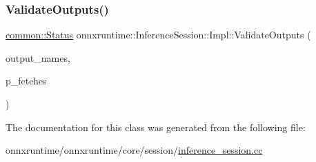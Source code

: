 \subsubsection{\texorpdfstring{Validate\+Outputs()}{ValidateOutputs()}}
{\footnotesize\ttfamily \mbox{\hyperlink{classonnxruntime_1_1common_1_1Status}{common\+::\+Status}} onnxruntime\+::\+Inference\+Session\+::\+Impl\+::\+Validate\+Outputs (\begin{DoxyParamCaption}\item[{const std\+::vector$<$ std\+::string $>$ \&}]{output\+\_\+names,  }\item[{const std\+::vector$<$ \mbox{\hyperlink{classonnxruntime_1_1MLValue}{M\+L\+Value}} $>$ $\ast$}]{p\+\_\+fetches }\end{DoxyParamCaption})\hspace{0.3cm}{\ttfamily [inline]}}



The documentation for this class was generated from the following file\+:\begin{DoxyCompactItemize}
\item 
onnxruntime/onnxruntime/core/session/\mbox{\hyperlink{inference__session_8cc}{inference\+\_\+session.\+cc}}\end{DoxyCompactItemize}
